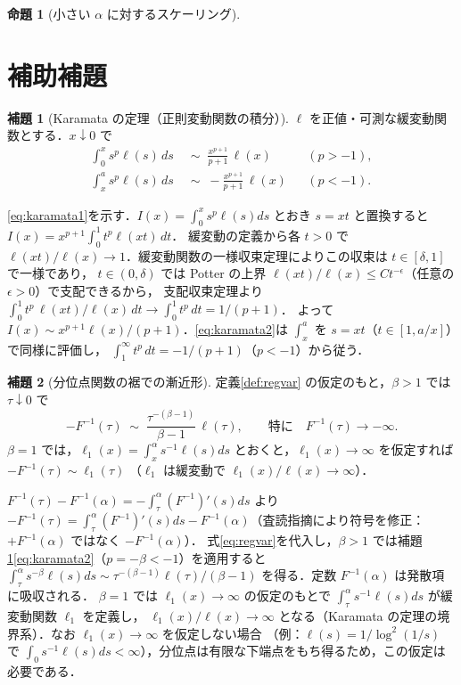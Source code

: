 \documentclass[a4paper,10pt]{jsarticle}
\makeatletter
\theoremstyle{definition}
\newtheorem{proposition}{命題}[section]
\newtheorem{lemma}{補題}[section]
\renewenvironment{proof}[1][\proofname]{\par
  \pushQED{\qed}%
  \normalfont \topsep6\p@\@plus6\p@\relax
  \trivlist
  \item[\hskip\labelsep\textbf{#1}]\ignorespaces
}{%
  \popQED\endtrivlist\@endpefalse
}
\renewcommand{\proofname}{証明}
\newcommand{\Finv}{F^{-1}}
\makeatother
\begin{document}
\begin{proposition}[小さい $\alpha$ に対するスケーリング]
\label{prop:alpha}

\section{補助補題}
\label{sec:aux}

\begin{lemma}[Karamata の定理（正則変動関数の積分）]
\label{lem:karamata}
$\ell$ を正値・可測な緩変動関数とする．$x\downarrow0$ で
\begin{align}
  \int_0^x s^{p}\ell(s)\,ds&\;\sim\;\frac{x^{p+1}}{p+1}\,\ell(x)&&(p>-1),\label{eq:karamata1}\\
  \int_x^{a} s^{p}\ell(s)\,ds&\;\sim\;-\frac{x^{p+1}}{p+1}\,\ell(x)&&(p<-1).\label{eq:karamata2}
\end{align}
\end{lemma}
\begin{proof}
\eqref{eq:karamata1}を示す．$I(x)=\int_0^x s^p\ell(s)ds$ とおき $s=xt$ と置換すると $I(x)=x^{p+1}\int_0^1 t^p\ell(xt)\,dt$．
緩変動の定義から各 $t>0$ で $\ell(xt)/\ell(x)\to1$．緩変動関数の一様収束定理によりこの収束は $t\in[\delta,1]$ で一様であり，
$t\in(0,\delta)$ では Potter の上界 $\ell(xt)/\ell(x)\le C t^{-\epsilon}$（任意の $\epsilon>0$）で支配できるから，
支配収束定理より $\int_0^1 t^p\,\ell(xt)/\ell(x)\,dt\to\int_0^1 t^p\,dt=1/(p+1)$．
よって $I(x)\sim x^{p+1}\ell(x)/(p+1)$．\eqref{eq:karamata2}は $\int_x^a$ を $s=xt$（$t\in[1,a/x]$）で同様に評価し，
$\int_1^\infty t^p\,dt=-1/(p+1)$（$p<-1$）から従う．
\end{proof}

\begin{lemma}[分位点関数の裾での漸近形]
\label{lem:tail}
定義\ref{def:regvar} の仮定のもと，$\beta>1$ では $\tau\downarrow0$ で
\begin{equation}
  -\Finv(\tau)\;\sim\;\frac{\tau^{-(\beta-1)}}{\beta-1}\,\ell(\tau),
  \qquad\text{特に}\quad \Finv(\tau)\to-\infty .
  \label{eq:tail}
\end{equation}
$\beta=1$ では，$\ell_1(x)=\int_x^\alpha s^{-1}\ell(s)ds$ とおくと，$\ell_1(x)\to\infty$ を仮定すれば $-\Finv(\tau)\sim\ell_1(\tau)$
（$\ell_1$ は緩変動で $\ell_1(x)/\ell(x)\to\infty$）．
\end{lemma}
\begin{proof}
$\Finv(\tau)-\Finv(\alpha)=-\int_\tau^\alpha(\Finv)'(s)ds$ より
$-\Finv(\tau)=\int_\tau^\alpha(\Finv)'(s)ds-\Finv(\alpha)$（査読指摘により符号を修正：$+\Finv(\alpha)$ ではなく $-\Finv(\alpha)$）．
式\eqref{eq:regvar}を代入し，$\beta>1$ では補題\ref{lem:karamata}\eqref{eq:karamata2}（$p=-\beta<-1$）を適用すると
$\int_\tau^\alpha s^{-\beta}\ell(s)ds\sim\tau^{-(\beta-1)}\ell(\tau)/(\beta-1)$ を得る．定数 $\Finv(\alpha)$ は発散項に吸収される．
$\beta=1$ では $\ell_1(x)\to\infty$ の仮定のもとで $\int_\tau^\alpha s^{-1}\ell(s)ds$ が緩変動関数 $\ell_1$ を定義し，
$\ell_1(x)/\ell(x)\to\infty$ となる（Karamata の定理の境界系）．なお $\ell_1(x)\to\infty$ を仮定しない場合
（例：$\ell(s)=1/\log^2(1/s)$ で $\int_0 s^{-1}\ell(s)ds<\infty$），分位点は有限な下端点をもち得るため，この仮定は必要である．
\end{proof}


\end{proposition}
\end{document}
